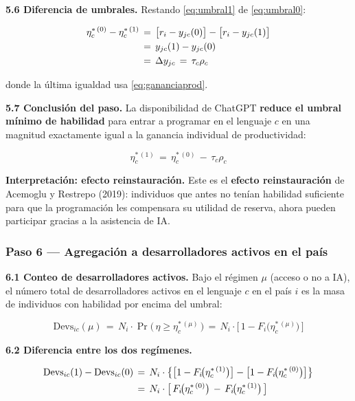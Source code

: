 \documentclass[11pt,a4paper]{article}
\theoremstyle{definition}
\begin{document}
\textbf{5.6 Diferencia de umbrales.} Restando \eqref{eq:umbral1} de \eqref{eq:umbral0}:

\begin{align}
\eta_c^{*\,(0)} - \eta_c^{*\,(1)}
&\,=\, \bigl[r_i - y_{jc}(0)\bigr] - \bigl[r_i - y_{jc}(1)\bigr] \notag \\
&\,=\, y_{jc}(1) - y_{jc}(0) \notag \\
&\,=\, \Delta y_{jc} \,=\, \tau_c\rho_c
\label{eq:dif_umbral}
\end{align}

donde la última igualdad usa \eqref{eq:gananciaprod}.

\textbf{5.7 Conclusión del paso.} La disponibilidad de ChatGPT \textbf{reduce el umbral mínimo de habilidad} para entrar a programar en el lenguaje $c$ en una magnitud exactamente igual a la ganancia individual de productividad:

\begin{equation}
\boxed{\;\eta_c^{*\,(1)} \,=\, \eta_c^{*\,(0)} \,-\, \tau_c\rho_c\;}
\end{equation}

\textbf{Interpretación: efecto reinstauración.} Este es el \textbf{efecto reinstauración} de Acemoglu y Restrepo (2019): individuos que antes no tenían habilidad suficiente para que la programación les compensara su utilidad de reserva, ahora pueden participar gracias a la asistencia de IA.

\subsubsection*{Paso 6 --- Agregación a desarrolladores activos en el país}

\textbf{6.1 Conteo de desarrolladores activos.} Bajo el régimen $\mu$ (acceso o no a IA), el número total de desarrolladores activos en el lenguaje $c$ en el país $i$ es la masa de individuos con habilidad por encima del umbral:

\begin{equation}
\text{Devs}_{ic}(\mu) \,=\, N_i \cdot \Pr\!\bigl(\,\eta \geq \eta_c^{*\,(\mu)}\,\bigr) \,=\, N_i\cdot\bigl[\,1 - F_i\!\bigl(\eta_c^{*\,(\mu)}\bigr)\,\bigr]
\label{eq:devs}
\end{equation}

\textbf{6.2 Diferencia entre los dos regímenes.}

\begin{align}
\text{Devs}_{ic}(1) - \text{Devs}_{ic}(0)
&\,=\, N_i\cdot\bigl\{\bigl[1 - F_i\!\bigl(\eta_c^{*\,(1)}\bigr)\bigr] - \bigl[1 - F_i\!\bigl(\eta_c^{*\,(0)}\bigr)\bigr]\bigr\} \notag \\
&\,=\, N_i\cdot\bigl[\,F_i\!\bigl(\eta_c^{*\,(0)}\bigr) \,-\, F_i\!\bigl(\eta_c^{*\,(1)}\bigr)\,\bigr]
\label{eq:dif_devs}
\end{align}
\end{document}
